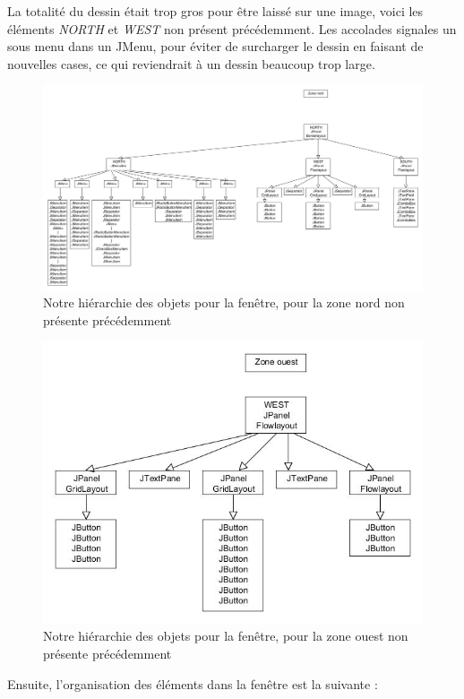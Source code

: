 \documentclass[12pt, a4paper]{article}
\begin{document}
La totalité du dessin était trop gros pour être laissé sur une image, voici les éléments \emph{NORTH} et \emph{WEST} non présent précédemment. Les accolades signales un sous menu dans un JMenu, pour éviter de surcharger le dessin en faisant de nouvelles cases, ce qui reviendrait à un dessin beaucoup trop large.
\newpage
\begin{figure}[h]
\begin{center}
   \includegraphics[scale = 0.35]{arbre_jframe_nord.jpg}
	\caption{Notre hiérarchie des objets pour la fenêtre, pour la zone nord non présente précédemment}
	\end{center}
\end{figure}

\begin{figure}[h]
\begin{center}
   \includegraphics[scale = 0.35]{arbre_jframe_ouest.jpg}
	\caption{Notre hiérarchie des objets pour la fenêtre,  pour la zone ouest non présente précédemment}
	\end{center}
\end{figure}
\newpage
Ensuite, l'organisation des éléments dans la fenêtre est la suivante :
\end{document}
